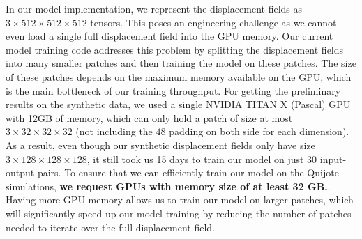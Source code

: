 \documentclass[11pt]{article}
\begin{document}
In our model implementation, we represent the displacement fields as $3 \times 512 \times 512 \times 512$ tensors. This poses an engineering challenge as we cannot even load a single full displacement field into the GPU memory. Our current model training code addresses this problem by splitting the displacement fields into many smaller patches and then training the model on these patches. The size of these patches depends on the maximum memory available on the GPU, which is the main bottleneck of our training throughput. For getting the preliminary results on the synthetic data, we used a single NVIDIA TITAN X (Pascal) GPU with 12GB of memory, which can only hold a patch of size at most $3 \times 32 \times 32 \times 32$ (not including the $48$ padding on both side for each dimension). As a result, even though our synthetic displacement fields only have size $3 \times 128 \times 128 \times 128$, it still took us 15 days to train our model on just 30 input-output pairs. To ensure that we can efficiently train our model on the Quijote simulations, \textbf{we request GPUs with memory size of at least 32 GB.}. Having more GPU memory allows us to train our model on larger patches, which will significantly speed up our model training by reducing the number of patches needed to iterate over the full displacement field.

\pagebreak

\printbibliography
\end{document}
